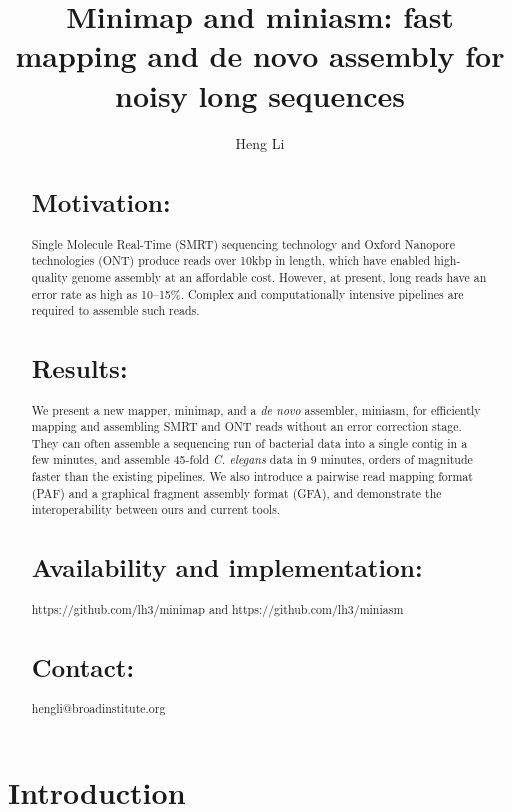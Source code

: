 \documentclass{bioinfo}
\begin{document}

\title[Long-read mapping and assembly]{Minimap and miniasm: fast mapping and de novo assembly for noisy long sequences}
\author[Li]{Heng Li}
\address{Broad Institute, 75 Ames Street, Cambridge, MA 02142, USA}
\maketitle

\begin{abstract}

\section{Motivation:} Single Molecule Real-Time (SMRT) sequencing technology and Oxford
Nanopore technologies (ONT) produce reads over 10kbp in length, which have
enabled high-quality genome assembly at an affordable cost.  However, at
present, long reads have an error rate as high as 10--15\%.  Complex and
computationally intensive pipelines are required to assemble such reads.

\section{Results:} We present a new mapper, minimap, and a \emph{de novo}
assembler, miniasm, for efficiently mapping and assembling SMRT and ONT reads
without an error correction stage. They can often assemble a sequencing run of
bacterial data into a single contig in a few minutes, and assemble 45-fold
\emph{C. elegans} data in 9 minutes, orders of magnitude faster than the
existing pipelines. We also introduce a pairwise read mapping format (PAF) and
a graphical fragment assembly format (GFA), and demonstrate the
interoperability between ours and current tools.

\section{Availability and implementation:} https://github.com/lh3/minimap and
https://github.com/lh3/miniasm

\section{Contact:} hengli@broadinstitute.org

\end{abstract}

\section{Introduction}
\end{document}
